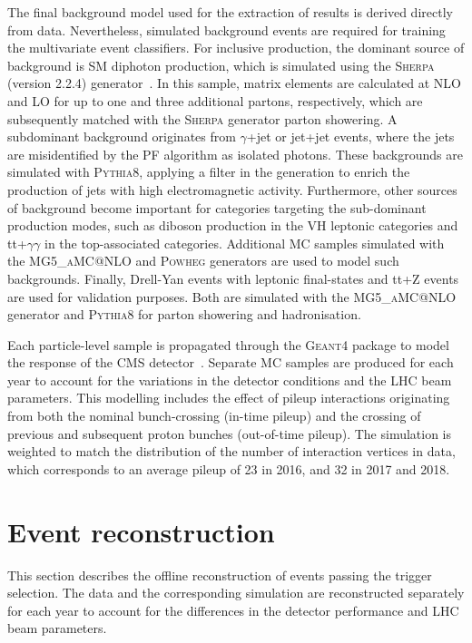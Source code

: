 The final background model used for the extraction of results is derived directly from data. Nevertheless, simulated background events are required for training the multivariate event classifiers. For inclusive production, the dominant source of background is SM diphoton production, which is simulated using the \textsc{Sherpa} (version 2.2.4) generator~\cite{Gleisberg:2008ta}. In this sample, matrix elements are calculated at NLO and LO for up to one and three additional partons, respectively, which are subsequently matched with the \textsc{Sherpa} generator parton showering. A subdominant background originates from $\gamma$+jet or jet+jet events, where the jets are misidentified by the PF algorithm as isolated photons. These backgrounds are simulated with \textsc{Pythia8}, applying a filter in the generation to enrich the production of jets with high electromagnetic activity. Furthermore, other sources of background become important for categories targeting the sub-dominant production modes, such as diboson production in the VH leptonic categories and tt+$\gamma\gamma$ in the top-associated categories. Additional MC samples simulated with the \textsc{MG5\_aMC@NLO} and \textsc{Powheg} generators are used to model such backgrounds. Finally, Drell-Yan events with leptonic final-states and tt+Z events are used for validation purposes. Both are simulated with the \textsc{MG5\_aMC@NLO} generator and \textsc{Pythia8} for parton showering and hadronisation.

Each particle-level sample is propagated through the \textsc{Geant4} package to model the response of the CMS detector~\cite{Agostinelli:2002hh}. Separate MC samples are produced for each year to account for the variations in the detector conditions and the LHC beam parameters. This modelling includes the effect of pileup interactions originating from both the nominal bunch-crossing (in-time pileup) and the crossing of previous and subsequent proton bunches (out-of-time pileup). The simulation is weighted to match the distribution of the number of interaction vertices in data, which corresponds to an average pileup of 23 in 2016, and 32 in 2017 and 2018.

\section{Event reconstruction}\label{sec:event_reconstruction}
This section describes the offline reconstruction of events passing the trigger selection. The data and the corresponding simulation are reconstructed separately for each year to account for the differences in the detector performance and LHC beam parameters. 

